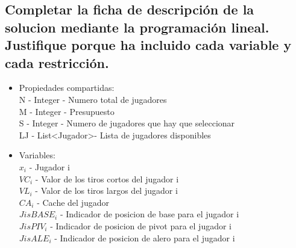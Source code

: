 \documentclass[a4paper,12pt]{article}
\begin{document}
\subsection{Completar la ficha de descripción de la solucion mediante la programación lineal. Justifique porque ha incluido cada variable y cada restricción.}

\begin{itemize}
\item Propiedades compartidas:\\
N - Integer - Numero total de jugadores\\
M - Integer - Presupuesto\\
S - Integer - Numero de jugadores que hay que seleccionar\\
LJ - List\textless Jugador\textgreater - Lista de jugadores disponibles\\
\item Variables:\\
\begin{math}
 x_i
\end{math}
- Jugador i\\
\begin{math}
VC_i
\end{math}
- Valor de los tiros cortos del jugador i\\
\begin{math}
VL_i
\end{math}
- Valor de los tiros largos del jugador i\\
 \begin{math}
CA_i
 \end{math}
 - Cache del jugador\\
 \begin{math}
JisBASE_i
 \end{math}
 - Indicador de posicion de base para el jugador i\\
 \begin{math}
JisPIV_i
 \end{math}
 - Indicador de posicion de pivot para el jugador i\\
 \begin{math}
JisALE_i
 \end{math}
 - Indicador de posicion de alero para el jugador i\\


\end{itemize}
\end{document}
